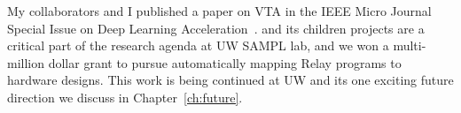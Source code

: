 My collaborators and I published a paper on VTA in
  the IEEE Micro Journal Special Issue on Deep Learning Acceleration~\citep{moreau2018vta}.
\vta and its children projects are a critical part of the research
  agenda at UW SAMPL lab, and we won a multi-million dollar grant to
  pursue automatically mapping Relay programs to hardware designs.
This work is being continued at UW and its one exciting future
  direction we discuss in Chapter~\ref{ch:future}.
